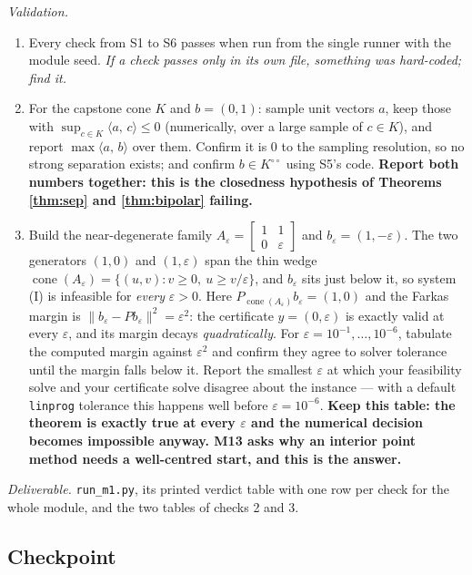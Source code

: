 \documentclass[11pt,a4paper]{article}
\theoremstyle{definition}
\theoremstyle{plain}
\theoremstyle{remark}
\newcommand{\ip}[2]{\langle #1,\, #2\rangle}
\newcommand{\norm}[1]{\lVert #1\rVert}
\newcommand{\proj}{P}
\DeclareMathOperator{\cone}{cone}
\begin{document}
\emph{Validation.}
\begin{enumerate}
\item Every check from S1 to S6 passes when run from the single runner with the module seed.
\emph{If a check passes only in its own file, something was hard-coded; find it.}
\item For the capstone cone $K$ and $b=(0,1)$: sample unit vectors $a$, keep those with
$\sup_{c\in K}\ip{a}{c}\le0$ (numerically, over a large sample of $c\in K$), and report
$\max\ip{a}{b}$ over them. Confirm it is $0$ to the sampling resolution, so no strong separation
exists; and confirm $b\in K^{\circ\circ}$ using S5's code. \textbf{Report both numbers together:
this is the closedness hypothesis of Theorems \ref{thm:sep} and \ref{thm:bipolar} failing.}
\item Build the near-degenerate family
$A_\varepsilon=\begin{bmatrix}1&1\\0&\varepsilon\end{bmatrix}$ and
$b_\varepsilon=(1,-\varepsilon)$. The two generators $(1,0)$ and $(1,\varepsilon)$ span the thin
wedge $\cone(A_\varepsilon)=\{(u,v):v\ge0,\ u\ge v/\varepsilon\}$, and $b_\varepsilon$ sits just
below it, so system (I) is infeasible for \emph{every} $\varepsilon>0$. Here
$\proj_{\cone(A_\varepsilon)}b_\varepsilon=(1,0)$ and the Farkas margin is
$\norm{b_\varepsilon-\proj b_\varepsilon}^2=\varepsilon^2$: the certificate
$y=(0,\varepsilon)$ is exactly valid at every $\varepsilon$, and its margin decays
\emph{quadratically}. For $\varepsilon=10^{-1},\dots,10^{-6}$, tabulate the computed margin
against $\varepsilon^2$ and confirm they agree to solver tolerance until the margin falls below
it. Report the smallest $\varepsilon$ at which your feasibility solve and your certificate
solve disagree about the instance --- with a default \texttt{linprog} tolerance this happens
well before $\varepsilon=10^{-6}$. \textbf{Keep this table: the theorem is exactly true at every
$\varepsilon$ and the numerical decision becomes impossible anyway. M13 asks why an interior
point method needs a well-centred start, and this is the answer.}
\end{enumerate}

\emph{Deliverable.} \texttt{run\_m1.py}, its printed verdict table with one row per check for
the whole module, and the two tables of checks 2 and 3.

\subsection*{Checkpoint}
\end{document}
